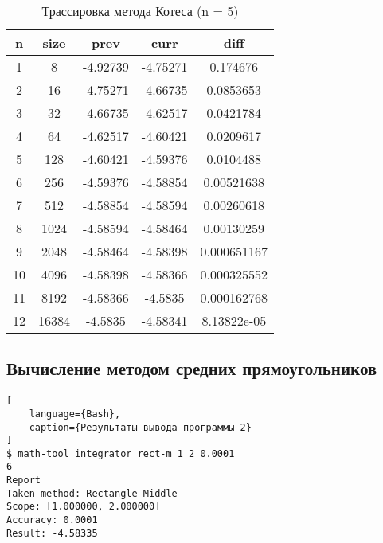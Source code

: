 \documentclass{article}
\begin{document}
\begin{table}[h]
    \centering
    \caption{Трассировка метода Котеса (n = 5)}
    \begin{tabular}{|c|c|c|c|c|}
        \hline
        n  & size  & prev     & curr     & diff        \\ \hline
        1  & 8     & -4.92739 & -4.75271 & 0.174676    \\ \hline
        2  & 16    & -4.75271 & -4.66735 & 0.0853653   \\ \hline
        3  & 32    & -4.66735 & -4.62517 & 0.0421784   \\ \hline
        4  & 64    & -4.62517 & -4.60421 & 0.0209617   \\ \hline
        5  & 128   & -4.60421 & -4.59376 & 0.0104488   \\ \hline
        6  & 256   & -4.59376 & -4.58854 & 0.00521638  \\ \hline
        7  & 512   & -4.58854 & -4.58594 & 0.00260618  \\ \hline
        8  & 1024  & -4.58594 & -4.58464 & 0.00130259  \\ \hline
        9  & 2048  & -4.58464 & -4.58398 & 0.000651167 \\ \hline
        10 & 4096  & -4.58398 & -4.58366 & 0.000325552 \\ \hline
        11 & 8192  & -4.58366 & -4.5835  & 0.000162768 \\ \hline
        12 & 16384 & -4.5835  & -4.58341 & 8.13822e-05 \\ \hline
    \end{tabular}
\end{table}

\subsection{Вычисление методом средних прямоугольников}

\begin{lstlisting}[
    language={Bash},
    caption={Результаты вывода программы 2}
]
$ math-tool integrator rect-m 1 2 0.0001
6
Report
Taken method: Rectangle Middle
Scope: [1.000000, 2.000000]
Accuracy: 0.0001
Result: -4.58335
\end{lstlisting}
\end{document}
